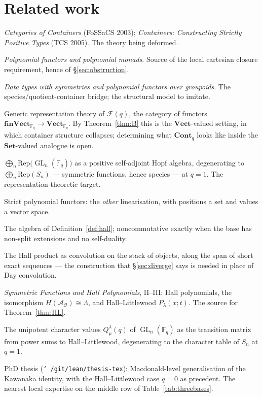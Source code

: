 \documentclass[11pt,a4paper]{article}
\theoremstyle{definition}
\theoremstyle{remark}
\newcommand{\FF}{\mathbb{F}}
\newcommand{\cat}[1]{\mathbf{#1}}
\newcommand{\Set}{\cat{Set}}
\newcommand{\Vect}{\cat{Vect}}
\newcommand{\finVect}{\cat{finVect}}
\newcommand{\Cont}{\cat{Cont}}
\newcommand{\Rep}{\mathrm{Rep}}
\DeclareMathOperator{\GL}{GL}
\begin{document}
\section{Related work}

\begin{description}[leftmargin=1.6em,style=nextline,nosep]
\item[Abbott, Altenkirch, Ghani.] \emph{Categories of Containers} (FoSSaCS 2003);
\emph{Containers: Constructing Strictly Positive Types} (TCS 2005). The theory
being deformed.
\item[Gambino, Kock.] \emph{Polynomial functors and polynomial monads}. Source of
the local cartesian closure requirement, hence of \S\ref{sec:obstruction}.
\item[Kock.] \emph{Data types with symmetries and polynomial functors over
groupoids}. The species/quotient-container bridge; the structural model to
imitate.
\item[Kuhn.] Generic representation theory of $\mathcal{F}(q)$, the category of
functors $\finVect_{\FF_q} \to \Vect_{\FF_q}$. By Theorem~\ref{thm:B} this is the
$\Vect$-valued setting, in which container structure collapses; determining what
$\Cont_q$ looks like inside the $\Set$-valued analogue is open.
\item[Zelevinsky.] $\bigoplus_n \Rep\bigl(\GL_n(\FF_q)\bigr)$ as a positive
self-adjoint Hopf algebra, degenerating to $\bigoplus_n \Rep(S_n)$ --- symmetric
functions, hence species --- at $q=1$. The representation-theoretic target.
\item[Friedlander, Suslin.] Strict polynomial functors: the \emph{other}
linearisation, with positions a set and values a vector space.
\item[Ringel, Hall.] The algebra of Definition~\ref{def:hall}; noncommutative
exactly when the base has non-split extensions and no self-duality.
\item[Kapranov, Vasserot; Schiffmann.] The Hall product as convolution on the
stack of objects, along the span of short exact sequences --- the construction
that \S\ref{sec:diverge} says is needed in place of Day convolution.
\item[Macdonald.] \emph{Symmetric Functions and Hall Polynomials}, II--III: Hall
polynomials, the isomorphism $H(\mathcal{A}_{\mathcal{O}}) \cong \Lambda$, and
Hall--Littlewood $P_\lambda(x;t)$. The source for Theorem~\ref{thm:HL}.
\item[Green.] The unipotent character values $Q^{\lambda}_{\mu}(q)$ of
$\GL_n(\FF_q)$ as the transition matrix from power sums to Hall--Littlewood,
degenerating to the character table of $S_n$ at $q = 1$.
\item[Langer.] PhD thesis (\texttt{\char`~/git/lean/thesis-tex}): Macdonald-level
generalisation of the Kawanaka identity, with the Hall--Littlewood case $q=0$ as
precedent. The nearest local expertise on the middle row of
Table~\ref{tab:threebases}.
\end{description}
\end{document}
